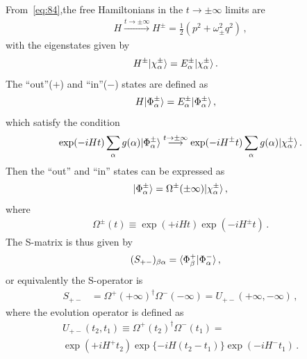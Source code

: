 \documentclass[12pt,a4paper]{article}
\begin{document}
From~\eqref{eq:84},the free Hamiltonians in the $t\rightarrow\pm
\infty$ limits are
\begin{equation}
\label{eq:85}
\begin{split}
H\stackrel{t\rightarrow\pm \infty}{\longrightarrow} H^{\pm
}=\frac{1}{2}(p^2+\omega_{\pm }^2q^2) \,,
\end{split}
\end{equation}
with the eigenstates given by
\begin{equation}
\label{eq:86}
\begin{split}
H^{\pm }\arrowvert\chi^{\pm}_\alpha\rangle &= E^{\pm
}_\alpha\arrowvert\chi^{\pm }_\alpha\rangle \,.
\end{split}
\end{equation}
The ``out''($+$) and ``in''($-$) states are defined as
\begin{equation}
\label{eq:87}
\begin{split}
H\arrowvert\Phi^{\pm }_\alpha\rangle &= E^{\pm
}_\alpha\arrowvert\Phi^{\pm }_\alpha\rangle \,,
\end{split}
\end{equation}
which satisfy the condition~\cite{m}
\begin{equation}
\label{eq:88}
\begin{split}
\exp(-i H t)\sum_{\alpha}g(\alpha)\arrowvert\Phi_{\alpha}^{\pm
}\rangle\stackrel{t\rightarrow\pm \infty}{\longrightarrow} \exp(-i
H^{\pm }t)\sum_{\alpha}g(\alpha)\arrowvert\chi^{\pm }_\alpha\rangle
\,.
\end{split}
\end{equation}
Then the ``out'' and ``in'' states can be expressed as
\begin{equation}
\label{eq:89}
\begin{split}
\arrowvert\Phi_{\alpha}^{\pm }\rangle=\Omega^{\pm} (\pm
\infty)\arrowvert\chi^{\pm }_\alpha\rangle \,,
\end{split}
\end{equation}
where
\begin{equation}
\label{eq:90}
\begin{split}
\Omega^{\pm }(t)\equiv\exp(+i H t)\exp(-i H^{\pm }t) \,.
\end{split}
\end{equation}
The S-matrix is thus given by
\begin{equation}
\label{eq:91}
\begin{split}
(S_{+-})_{\beta\alpha} &=
\langle\Phi_{\beta}^{+}\arrowvert\Phi_{\alpha}^{-}\rangle \,,
\end{split}
\end{equation}
or equivalently the S-operator is
\begin{equation}
\label{eq:92}
\begin{split}
S_{+-} &= \Omega^+(+\infty)^{\dag}\Omega^-(-\infty) =
U_{+-}(+\infty,-\infty) \,,
\end{split}
\end{equation}
where the evolution operator is defined as
\begin{multline}
\label{eq:93}
U_{+-}(t_2,t_1)\equiv \Omega^+(t_2)^{\dag}\Omega^-(t_1)= \\ \exp(+i
H^+t_2)\exp\{-i H(t_2-t_1)\}\exp(-i H^-t_1) \,.
\end{multline}
\end{document}
